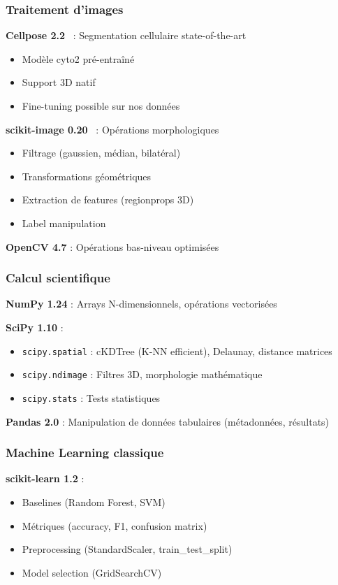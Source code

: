 \subsubsection{Traitement d'images}

\textbf{Cellpose 2.2}~\cite{Stringer2021} : Segmentation cellulaire state-of-the-art
\begin{itemize}
    \item Modèle cyto2 pré-entraîné
    \item Support 3D natif
    \item Fine-tuning possible sur nos données
\end{itemize}

\textbf{scikit-image 0.20}~\cite{VanDerWalt2014} : Opérations morphologiques
\begin{itemize}
    \item Filtrage (gaussien, médian, bilatéral)
    \item Transformations géométriques
    \item Extraction de features (regionprops 3D)
    \item Label manipulation
\end{itemize}

\textbf{OpenCV 4.7} : Opérations bas-niveau optimisées

\subsubsection{Calcul scientifique}

\textbf{NumPy 1.24} : Arrays N-dimensionnels, opérations vectorisées

\textbf{SciPy 1.10} : 
\begin{itemize}
    \item \texttt{scipy.spatial} : cKDTree (K-NN efficient), Delaunay, distance matrices
    \item \texttt{scipy.ndimage} : Filtres 3D, morphologie mathématique
    \item \texttt{scipy.stats} : Tests statistiques
\end{itemize}

\textbf{Pandas 2.0} : Manipulation de données tabulaires (métadonnées, résultats)

\subsubsection{Machine Learning classique}

\textbf{scikit-learn 1.2} :
\begin{itemize}
    \item Baselines (Random Forest, SVM)
    \item Métriques (accuracy, F1, confusion matrix)
    \item Preprocessing (StandardScaler, train\_test\_split)
    \item Model selection (GridSearchCV)
\end{itemize}


